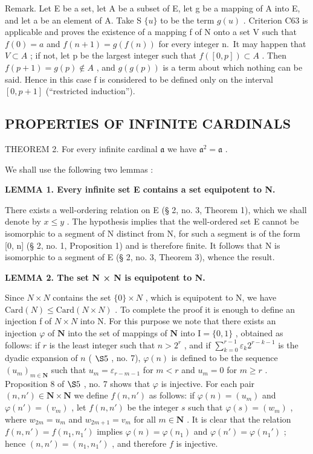 Remark. Let E be a set, let A be a subset of E, let g be a mapping of A into E, and let a be an element of A. Take S \(\{u\}\) to be the term \(g(u)\) . Criterion C63 is applicable and proves the existence of a mapping f of N onto a set V such that \(f(0) = a\) and \(f(n+1) = g(f(n))\) for every integer n.~It may happen that \(V \subset A\) ; if not, let p be the largest integer such that \(f([0, p]) \subset A\) . Then \(f(p+1) = g(p) \notin A\) , and \(g(g(p))\) is a term about which nothing can be said. Hence in this case f is considered to be defined only on the interval \([0, p+1]\) (``restricted induction'').

\subsection{PROPERTIES OF INFINITE CARDINALS}

THEOREM 2. For every infinite cardinal \(\mathfrak{a}\) we have \(\mathfrak{a}^2 = \mathfrak{a}\) .

We shall use the following two lemmas :

\textbf{LEMMA 1. Every infinite set E contains a set equipotent to N.}

There exists a well-ordering relation on E (§ 2, no. 3, Theorem 1), which we shall denote by \(x \leqslant y\) . The hypothesis implies that the well-ordered set E cannot be isomorphic to a segment of N distinct from N, for such a segment is of the form {[}0, n{]} (§ 2, no. 1, Proposition 1) and is therefore finite. It follows that N is isomorphic to a segment of E (§ 2, no. 3, Theorem 3), whence the result.

\textbf{LEMMA 2. The set N × N is equipotent to N.}

Since \(N \times N\) contains the set \(\{0\} \times N\) , which is equipotent to N, we have \(\text{Card}(N) \leqslant \text{Card}(N \times N)\) . To complete the proof it is enough to define an injection f of \(N \times N\) into N. For this purpose we note that there exists an injection \(\varphi\) of \(\mathbf{N}\) into the set of mappings of \(\mathbf{N}\) into \(\mathrm{I} = \{0,1\}\) , obtained as follows: if \(r\) is the least integer such that \(n > 2^r\) , and if \(\sum_{k=0}^{r-1}\varepsilon_k2^{r-k-1}\) is the dyadic expansion of \(n\) ( \(\S 5\) , no. 7), \(\varphi(n)\) is defined to be the sequence \((u_m)_{m\in\mathbf{N}}\) such that \(u_m = \varepsilon_{r-m-1}\) for \(m < r\) and \(u_m = 0\) for \(m \geqslant r\) . Proposition 8 of \(\S 5\) , no. 7 shows that \(\varphi\) is injective. For each pair \((n, n') \in \mathbf{N} \times \mathbf{N}\) we define \(f(n, n')\) as follows: if \(\varphi(n) = (u_m)\) and \(\varphi(n') = (v_m)\) , let \(f(n, n')\) be the integer \(s\) such that \(\varphi(s) = (w_m)\) , where \(w_{2m} = u_m\) and \(w_{2m+1} = v_m\) for all \(m \in \mathbf{N}\) . It is clear that the relation \(f(n, n') = f(n_1, n_1')\) implies \(\varphi(n) = \varphi(n_1)\) and \(\varphi(n') = \varphi(n_1')\) ; hence \((n, n') = (n_1, n_1')\) , and therefore \(f\) is injective.

